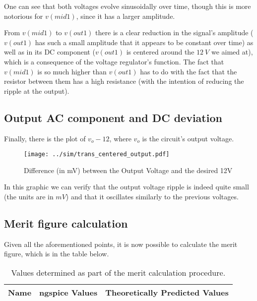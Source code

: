 One can see that both voltages evolve sinusoidally over time, though this is more notorious for $v(mid1)$, since it has a larger amplitude. %

From $v(mid1)$ to $v(out1)$ there is a clear reduction in the signal's amplitude ($v(out1)$ has such a small amplitude that it appears to be constant over time) as well as in its DC component ($v(out1)$ is centered around the $12 \ V$ we aimed at), which is a consequence of the voltage regulator's function.
The fact that $v(mid1)$ is so much higher than $v(out1)$ has to do with the fact that the resistor between them has a high resistance (with the intention of reducing the ripple at the output).




\subsection{Output AC component and DC deviation}
Finally, there is the plot of $v_o - 12$, where $v_o$ is the circuit's output voltage.

\begin{figure}[H] \centering
\texttt{[image: ../sim/trans\_centered\_output.pdf]}
\caption{Difference (in mV) between the Output Voltage and the desired 12V}
\label{fig:ngspice_centered_output}
\end{figure}

In this graphic we can verify that the output voltage ripple is indeed quite small (the units are in $mV$) and that it oscillates similarly to the previous voltages.




\subsection{Merit figure calculation}
Given all the aforementioned points, it is now possible to calculate the merit figure, which is in the table below.

\begin{table}[H]
  \centering
  \begin{tabular}{|c|c|c|}
    \hline    
    {\bf Name} & {\bf ngspice Values} & {\bf Theoretically Predicted Values} \\ \hline
    
  \end{tabular}
  \caption{Values determined as part of the merit calculation procedure.}
  \label{tab:merit}
\end{table}

